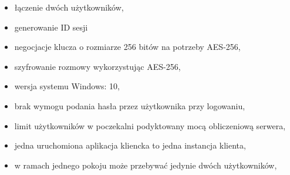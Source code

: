 \begin{itemize}
\item łączenie dwóch użytkowników,
\item generowanie ID sesji
\item negocjacje klucza o rozmiarze 256 bitów na potrzeby AES-256,
\item szyfrowanie rozmowy wykorzystując AES-256,
\item wersja systemu Windows: 10,
\item brak wymogu podania hasła przez użytkownika przy logowaniu,
\item limit użytkowników w poczekalni podyktowany mocą obliczeniową serwera,
\item jedna uruchomiona aplikacja kliencka to jedna instancja klienta,	\item w ramach jednego pokoju może przebywać jedynie dwóch użytkowników,
\end{itemize}
